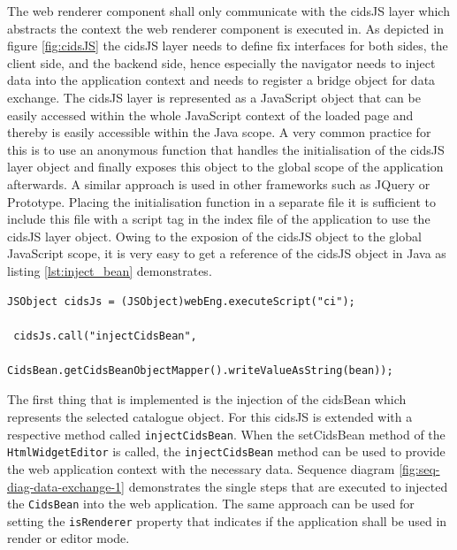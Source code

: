 The web renderer component shall only communicate with the cidsJS layer which abstracts the context the web renderer component is executed in.
As depicted in figure \ref{fig:cidsJS} the cidsJS layer needs to define fix interfaces for both sides, the client side, and the backend side, hence especially the navigator needs to inject data into the application context and needs to register a bridge object for data exchange.
The cidsJS layer is represented as a JavaScript object that can be easily accessed within the whole JavaScript context of the loaded page and thereby is easily accessible within the Java scope.
A very common practice for this is to use an anonymous function that handles the initialisation of the cidsJS layer object and finally exposes this object to the global scope of the application afterwards. 
A similar approach is used in other frameworks such as JQuery or Prototype.
Placing the initialisation function in a separate file it is sufficient to include this file with a script tag in the index file of the application to use the cidsJS layer object. 
Owing to the exposion of the cidsJS object to the global JavaScript scope, it is very easy to get a reference of the cidsJS object in Java as listing \ref{lst:inject_bean} demonstrates.
 

\begin{lstlisting}[label=lst:inject_bean,caption=Injecting the cidsBean to the JavaScript application]
JSObject cidsJs = (JSObject)webEng.executeScript("ci");

 cidsJs.call("injectCidsBean",
              CidsBean.getCidsBeanObjectMapper().writeValueAsString(bean));
\end{lstlisting}

The first thing that is implemented is the injection of the cidsBean which represents the selected catalogue object.
For this cidsJS is extended with a respective method called \texttt{injectCidsBean}.
When the setCidsBean method of the \texttt{HtmlWidgetEditor} is called, the \texttt{injectCidsBean} method can be used to provide the web application context with the necessary data.
Sequence diagram  \ref{fig:seq-diag-data-exchange-1} demonstrates the single steps that are executed to injected the  \texttt{CidsBean} into the web application.
The same approach can be used for setting the \texttt{isRenderer} property that indicates if the application shall be used in render or editor mode.

